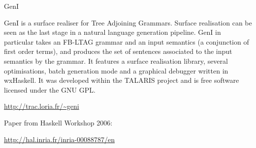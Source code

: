 \begin{hcarentry}[section]{GenI}
\label{geni}
\makeheader

GenI is a surface realiser for Tree Adjoining Grammars. Surface
realisation can be seen as the last stage in a natural language
generation pipeline. GenI in particular takes an FB-LTAG grammar and an
input semantics (a conjunction of first order terms), and produces the
set of sentences associated to the input semantics by the grammar.  It
features a surface realisation library, several optimisations, batch
generation mode and a graphical debugger written in wxHaskell.  It was
developed within the TALARIS project and is free software licensed under
the GNU GPL.

\FurtherReading
\begin{compactitem}
\item \url{http://trac.loria.fr/~geni}
\item Paper from Haskell Workshop 2006:

\url{http://hal.inria.fr/inria-00088787/en}
\end{compactitem}
\end{hcarentry}
